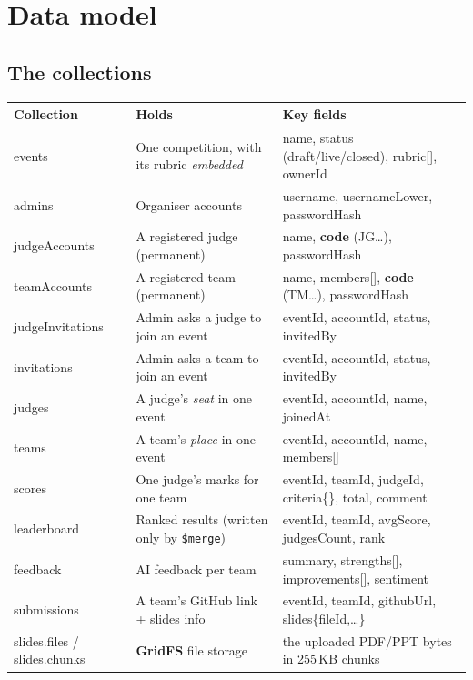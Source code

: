 \documentclass[11pt,a4paper]{article}
\newcommand{\op}[1]{\texttt{\$#1}}
\begin{document}
\section{Data model}

\subsection{The collections}
\begin{longtable}{@{}>{\ttfamily}p{3.3cm}p{6.2cm}p{5.6cm}@{}}
\toprule
\normalfont\textbf{Collection} & \textbf{Holds} & \textbf{Key fields}\\
\midrule
\endhead
events & One competition, with its rubric \emph{embedded} & name, status (draft/live/closed), rubric[], ownerId \\
admins & Organiser accounts & username, usernameLower, passwordHash \\
judgeAccounts & A registered judge (permanent) & name, \textbf{code} (JG\dots), passwordHash \\
teamAccounts & A registered team (permanent) & name, members[], \textbf{code} (TM\dots), passwordHash \\
judgeInvitations & Admin asks a judge to join an event & eventId, accountId, status, invitedBy \\
invitations & Admin asks a team to join an event & eventId, accountId, status, invitedBy \\
judges & A judge's \emph{seat} in one event & eventId, accountId, name, joinedAt \\
teams & A team's \emph{place} in one event & eventId, accountId, name, members[] \\
scores & One judge's marks for one team & eventId, teamId, judgeId, criteria\{\}, total, comment \\
leaderboard & Ranked results (written only by \op{merge}) & eventId, teamId, avgScore, judgesCount, rank \\
feedback & AI feedback per team & summary, strengths[], improvements[], sentiment \\
submissions & A team's GitHub link + slides info & eventId, teamId, githubUrl, slides\{fileId,\dots\} \\
slides.files / slides.chunks & \textbf{GridFS} file storage & the uploaded PDF/PPT bytes in 255\,KB chunks \\
\bottomrule
\end{longtable}
\end{document}
